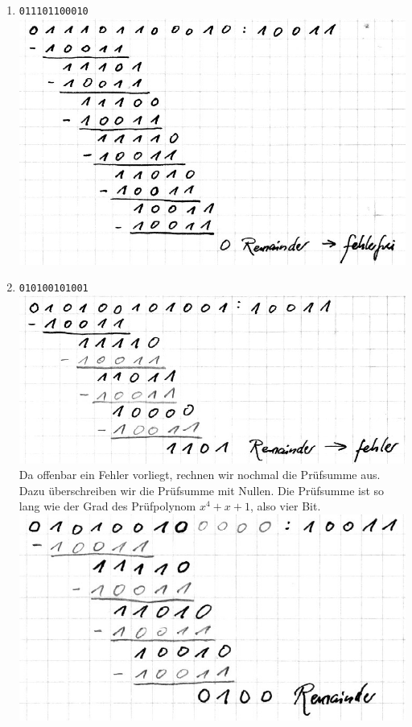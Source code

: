 \documentclass[10pt,a4paper]{scrartcl}
\begin{document}
\begin{enumerate}
\item \texttt{011101100010}\\
\includegraphics{a4e1_1.jpg}
\item \texttt{010100101001}\\
\includegraphics{a4e1_2.jpg}\\
Da offenbar ein Fehler vorliegt, rechnen wir nochmal die Prüfsumme aus. Dazu überschreiben wir die Prüfsumme mit Nullen. Die Prüfsumme ist so lang wie der Grad des Prüfpolynom $x^4+x+1$, also vier Bit.\\
\includegraphics{a4e1_2b.jpg}\\

\end{enumerate}
\end{document}
